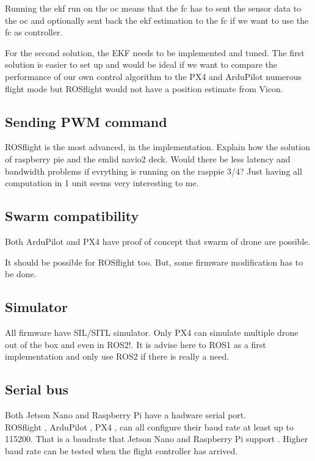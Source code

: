 Running the \gls{ekf} run on the \gls{oc} means that the \gls{fc} has to sent the sensor data to the \gls{oc} and optionally sent back the \gls{ekf} estimation to the \gls{fc} if we want to use the \gls{fc} as controller.

For the second solution, the EKF needs to be implemented and tuned.
The first solution is easier to set up and would be ideal if we want to compare the performance of our own control algorithm to the PX4 and ArduPilot numerous flight mode but ROSflight would not have a position estimate from Vicon.

\subsection{Sending PWM command}
ROSflight is the most advanced, in the implementation.
{\color{red}Explain how the solution of raspberry pie and the emlid navio2 deck. Would there be less latency and bandwidth problems if evrything is running on the rasppie 3/4? Just having all computation in 1 unit seems very interesting to me.}

\subsection{Swarm compatibility}
Both ArduPilot \cite{ardupilot_multi_vehicle} and PX4 \cite{px4_multi_vehicle}
have proof of concept that swarm of drone are possible.

It should be possible for ROSflight \cite{github_rosflight_100} too.
But, some firmware modification has to be done.

\subsection{Simulator}
All firmware have SIL/SITL simulator.
Only PX4 can simulate multiple drone out of the box {\color{red}and even in ROS2!}. It is advise here \cite{px4_ros2} to ROS1 as a first implementation and only use ROS2 if there is really a need.

\subsection{Serial bus}
Both Jetson Nano and Raspberry Pi have a hadware serial port.\\
ROSflight \cite{rosflight_parameters},
ArduPilot \cite{ardupilot_serial_parameters},
PX4 \cite{px4_serial_parameters},
can all configure their baud rate at least up to 115200. That is a baudrate that
Jetson Nano \cite{jetsonhacks_serial}
and
Raspberry Pi support \cite{rpi_stackexchange_serial}.
Higher baud rate can be tested when the flight controller has arrived.



